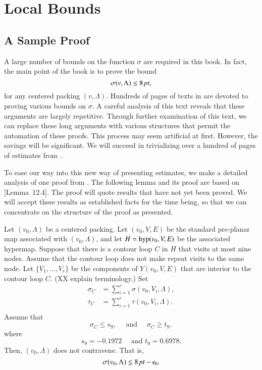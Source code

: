 

\chapter{Local Bounds}



\section{A Sample Proof}

A large number of bounds on the function
$\sigma$ are required in this book.  In fact, the main
point of the book is to prove the bound
  $$
  \sigma(v,\Lambda)\le 8\,\hbox{\it pt},
  $$
for any centered packing $(v,\Lambda)$.
Hundreds of pages of texts in \cite{DCG} are devoted to
proving various bounds on $\sigma$.  A careful analysis of
this text reveals that these arguments are largely repetitive.
Through further examination of this text, we can replace these
long arguments with various structures that permit the automation
of these proofs.  This process may seem artificial at first.
However, the savings will be significant.  We will succeed in
trivializing over a hundred of pages of estimates from \cite{DCG}.

To ease our way into this new way of presenting estimates, 
we make a detailed analysis of
one proof from \cite{DCG}.  The following lemma and its proof are
based on \cite{DCG}[Lemma~12.4].  The proof will quote results that
have not yet been proved.  We will accept these results 
as established facts for the time being, 
so that we can concentrate on the structure
of the proof as presented.


\begin{lemma}\label{lemma:nonagon}  
Let $(v_0,\Lambda)$ be a centered packing.
Let $(v_0,V,E)$ be the standard pre-planar map associated with $(v_0,\Lambda)$,
and let $H={\operatorname{hyp}}(v_0,V,E)$ be the associated hypermap.  
Suppose that there is a contour loop $C$ in $H$ that visits
at most nine nodes.  Assume that the contour loop does not make
repeat visits to the same node.
Let $\{V_1,\ldots,V_r\}$ be the components of $Y(v_0,V,E)$ that
are interior to the contour loop $C$.  (XX explain terminology.)
Set 
   $$
   \begin{array}{lll}
   \sigma_C &= \sum_{i=1}^r \sigma(v_0,V_i,\Lambda),\\
   \tau_C &= \sum_{i=1}^r \tau(v_0,V_i,\Lambda).\\
   \end{array}
   $$
Assume that
    $$
    \sigma_C \le s_9,\quad \text{ and } \quad \sigma_C \ge t_9,
    $$
where 
    $$
    s_9 = -0.1972 \quad \text{ and } t_9 = 0.6978.
    $$
Then, $(v_0,\Lambda)$ does not contravene.  That is,
$$
\sigma(v_0,\Lambda) \le 8\,\hbox{\it pt} - \epsilon_0.
$$
\end{lemma}

